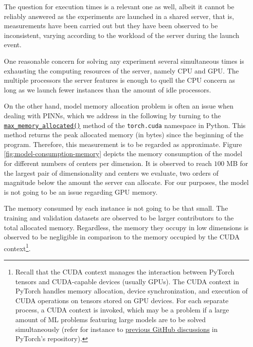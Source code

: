 \documentclass[12pt]{report} %
\begin{document}
The question for execution times is a relevant one as well, albeit it cannot be reliably answered as the experiments are launched in a shared server, that is, measurements have been carried out but they have been observed to be inconsistent, varying according to the workload of the server during the launch event.

One reasonable concern for solving any experiment several simultaneous times is exhausting the computing resources of the server, namely CPU and GPU. The multiple processors the server features is enough to quell the CPU concern as long as we launch fewer instances than the amount of idle processors. 

On the other hand, model memory allocation problem is often an issue when dealing with PINNs, which we address in the following by turning to the \href{https://pytorch.org/docs/stable/generated/torch.cuda.max_memory_allocated.html}{\texttt{max\_memory\_allocated()}}
method of the \texttt{torch.cuda} namespace in Python. This method returns the peak allocated memory (in bytes) since the beginning of the program. Therefore, this
measurement is to be regarded as approximate. Figure \ref{fig:model-consumption-memory} depicts the memory consumption of the
model for different numbers of centers per dimension. It is observed to reach $100$ MB for the largest pair of dimensionality and centers we evaluate, two orders of magnitude below the amount the server can allocate. For our purposes, the model is not going to be an issue regarding GPU memory.

The memory consumed by each instance is not going to be that small. The training and validation datasets are observed to be larger contributors to the total allocated memory. Regardless, the memory they occupy in low dimensions is observed to be negligible in comparison to the memory occupied by the CUDA context\footnote{Recall that the CUDA context manages the interaction between PyTorch tensors and CUDA-capable devices (usually GPUs). The CUDA context in PyTorch handles memory allocation, device synchronization, and execution of CUDA operations on tensors stored on GPU devices. For each separate process, a CUDA context is invoked, which may be a problem if a large amount of ML problems featuring large models are to be solved simultaneously  (refer for instance to \href{https://github.com/pytorch/pytorch/issues/20532}{previous GitHub discussions} in PyTorch's repository).}.
\end{document}
